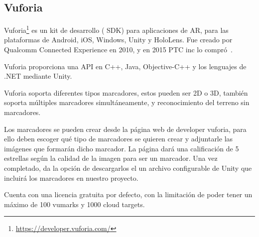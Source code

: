 \subsection{Vuforia}\label{sub:Def_Vuforia}

Vuforia\footnote{\url{https://developer.vuforia.com/}} es un kit de desarrollo ( SDK) para aplicaciones de AR, para las plataformas de Android, iOS, Windows, Unity y HoloLens. Fue creado por Qualcomm Connected Experience en 2010, y en 2015 PTC inc lo compró~\cite{simonetti2013vuforia}.

Vuforia proporciona una API en C++, Java, Objective-C++ y los lenguajes de .NET mediante Unity.

Vuforia soporta diferentes tipos marcadores, estos pueden ser 2D o 3D, también soporta múltiples marcadores simultáneamente, y reconocimiento del terreno sin marcadores.


Los marcadores se pueden crear desde la página web de developer vuforia, para ello deben escoger qué tipo de marcadores se quieren crear y adjuntarle las imágenes que formarán dicho marcador. La página dará una calificación de 5 estrellas según la calidad de la imagen para ser un marcador. Una vez completado, da la opción de descargarlos el un archivo configurable de Unity que incluirá los marcadores en nuestro proyecto.



Cuenta con una licencia gratuita por defecto, con la limitación de poder tener un máximo de 100 vumarks y 1000 cloud targets.

